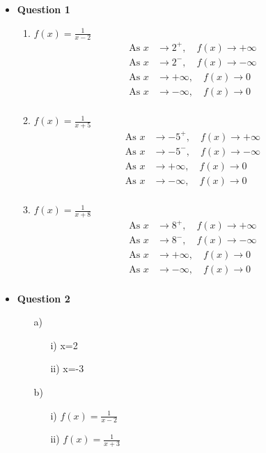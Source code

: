 \documentclass{article}
\begin{document}
\begin{itemize}
    \item \textbf{Question 1}
    \begin{enumerate}[label=\alph*)]
        \item $f(x) = \frac{1}{x-2}$
        \begin{align*}
            \text{As } x &\to 2^+, \quad f(x) \to +\infty \\
            \text{As } x &\to 2^-, \quad f(x) \to -\infty \\
            \text{As } x &\to +\infty, \quad f(x) \to 0 \\
            \text{As } x &\to -\infty, \quad f(x) \to 0 \\
        \end{align*}
        
        \item $f(x) = \frac{1}{x+5}$
        \begin{align*}
            \text{As } x &\to -5^+, \quad f(x) \to +\infty \\
            \text{As } x &\to -5^-, \quad f(x) \to -\infty \\
            \text{As } x &\to +\infty, \quad f(x) \to 0 \\
            \text{As } x &\to -\infty, \quad f(x) \to 0 \\
        \end{align*}
        
        \item $f(x) = \frac{1}{x+8}$
        \begin{align*}
            \text{As } x &\to 8^+, \quad f(x) \to +\infty \\
            \text{As } x &\to 8^-, \quad f(x) \to -\infty \\
            \text{As } x &\to +\infty, \quad f(x) \to 0 \\
            \text{As } x &\to -\infty, \quad f(x) \to 0 \\
        \end{align*}
    \end{enumerate}
    
    \item \textbf{Question 2}
\begin{enumerate}
    \item[a)]
    \begin{enumerate}
        \item [i)] x=2
        \item [ii)] x=-3
    \end{enumerate}
    \item[b)]
    \begin{enumerate}
        \item[i)] $f(x)=\frac{1}{x-2}$ 
        \item[ii)] $f(x)=\frac{1}{x+3}$ 
    \end{enumerate}
\end{enumerate}
    

\end{itemize}
\end{document}

